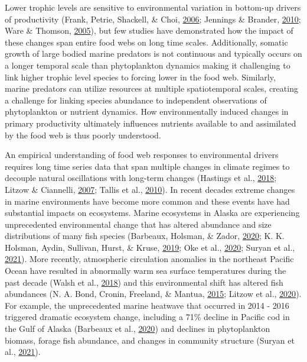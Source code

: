 \documentclass [11pt, proquest] {uwthesis}[2015/03/03]
\begin{document}
Lower trophic levels are sensitive to environmental variation in
bottom-up drivers of productivity (Frank, Petrie, Shackell, \& Choi,
\protect\hyperlink{ref-Frank2006}{2006}; Jennings \& Brander,
\protect\hyperlink{ref-Jennings2010}{2010}; Ware \& Thomson,
\protect\hyperlink{ref-Ware2005}{2005}), but few studies have
demonstrated how the impact of these changes span entire food webs on
long time scales. Additionally, somatic growth of large bodied marine
predators is not continuous and typically occurs on a longer temporal
scale than phytoplankton dynamics making it challenging to link higher
trophic level species to forcing lower in the food web. Similarly,
marine predators can utilize resources at multiple spatiotemporal
scales, creating a challenge for linking species abundance to
independent observations of phytoplankton or nutrient dynamics. How
environmentally induced changes in primary productivity ultimately
influences nutrients available to and assimilated by the food web is
thus poorly understood.

An empirical understanding of food web responses to environmental
drivers requires long time series data that span multiple changes in
climate regimes to decouple natural oscillations with long-term changes
(Hastings et al., \protect\hyperlink{ref-Hastings2018}{2018}; Litzow \&
Ciannelli, \protect\hyperlink{ref-Litzow2007}{2007}; Tallis et al.,
\protect\hyperlink{ref-Tallis2010}{2010}). In recent decades extreme
changes in marine environments have become more common and these events
have had substantial impacts on ecosystems. Marine ecosystems in Alaska
are experiencing unprecedented environmental change that has altered
abundance and size distributions of many fish species (Barbeaux,
Holsman, \& Zador, \protect\hyperlink{ref-Barbeaux2020}{2020}; K. K.
Holsman, Aydin, Sullivan, Hurst, \& Kruse,
\protect\hyperlink{ref-Holsman2019}{2019}; Oke et al.,
\protect\hyperlink{ref-Oke2020}{2020}; Suryan et al.,
\protect\hyperlink{ref-Suryan2021}{2021}). More recently, atmospheric
circulation anomalies in the northeast Pacific Ocean have resulted in
abnormally warm sea surface temperatures during the past decade (Walsh
et al., \protect\hyperlink{ref-Walsh2018}{2018}) and this environmental
shift has altered fish abundances (N. A. Bond, Cronin, Freeland, \&
Mantua, \protect\hyperlink{ref-Bond2015}{2015}; Litzow et al.,
\protect\hyperlink{ref-Litzow2020}{2020}). For example, the
unprecedented marine heatwave that occurred in 2014 - 2016 triggered
dramatic ecosystem change, including a 71\% decline in Pacific cod in
the Gulf of Alaska (Barbeaux et al.,
\protect\hyperlink{ref-Barbeaux2020}{2020}) and declines in
phytoplankton biomass, forage fish abundance, and changes in community
structure (Suryan et al., \protect\hyperlink{ref-Suryan2021}{2021}).
\end{document}
